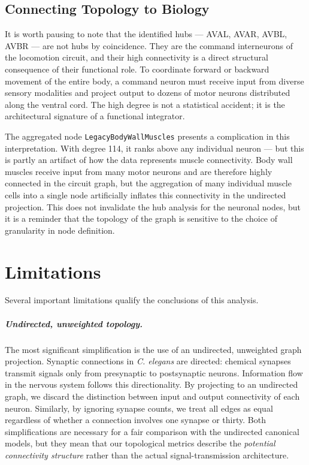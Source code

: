 \documentclass[12pt,a4paper]{report}
\begin{document}
\section{Connecting Topology to Biology}

It is worth pausing to note that the identified hubs — AVAL, AVAR, AVBL, AVBR — are not hubs by coincidence. They are the command interneurons of the locomotion circuit, and their high connectivity is a direct structural consequence of their functional role. To coordinate forward or backward movement of the entire body, a command neuron must receive input from diverse sensory modalities and project output to dozens of motor neurons distributed along the ventral cord. The high degree is not a statistical accident; it is the architectural signature of a functional integrator.

The aggregated node \texttt{LegacyBodyWallMuscles} presents a complication in this interpretation. With degree 114, it ranks above any individual neuron — but this is partly an artifact of how the data represents muscle connectivity. Body wall muscles receive input from many motor neurons and are therefore highly connected in the circuit graph, but the aggregation of many individual muscle cells into a single node artificially inflates this connectivity in the undirected projection. This does not invalidate the hub analysis for the neuronal nodes, but it is a reminder that the topology of the graph is sensitive to the choice of granularity in node definition.

\chapter{Limitations}
\label{sec:limitations}

Several important limitations qualify the conclusions of this analysis.

\paragraph{Undirected, unweighted topology.} The most significant simplification is the use of an undirected, unweighted graph projection. Synaptic connections in \textit{C. elegans} are directed: chemical synapses transmit signals only from presynaptic to postsynaptic neurons. Information flow in the nervous system follows this directionality. By projecting to an undirected graph, we discard the distinction between input and output connectivity of each neuron. Similarly, by ignoring synapse counts, we treat all edges as equal regardless of whether a connection involves one synapse or thirty. Both simplifications are necessary for a fair comparison with the undirected canonical models, but they mean that our topological metrics describe the \textit{potential connectivity structure} rather than the actual signal-transmission architecture.
\end{document}
